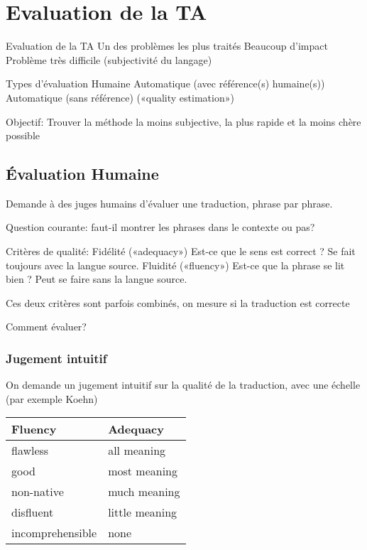 \vspace{-1.2cm}

\section{Evaluation de la TA}

Evaluation de la TA
    Un des problèmes les plus traités
    Beaucoup d’impact
    Problème très difficile (subjectivité du langage)

Types d’évaluation
    Humaine
    Automatique (avec référence(s) humaine(s))
    Automatique (sans référence) («quality estimation»)

    Objectif: Trouver la méthode la moins subjective, la plus rapide et la moins chère possible

\subsection{Évaluation Humaine}

Demande à des juges humains d’évaluer une traduction, phrase par phrase.

Question courante: faut-il montrer les phrases dans le contexte ou pas?

Critères de qualité:
    Fidélité («adequacy»)
        Est-ce que le sens est correct ?
        Se fait toujours avec la langue source.
    Fluidité («fluency»)
        Est-ce que la phrase se lit bien ?
        Peut se faire sans la langue source.

    Ces deux critères sont parfois combinés, on mesure si la traduction est correcte

Comment évaluer?

\subsubsection{Jugement intuitif}

On demande un jugement intuitif sur la qualité de la traduction, avec une échelle (par exemple Koehn)

\begin{table}
    \begin{tabular}{|l|l|}
    \hline
    Fluency          & Adequacy       \\ \hline
    flawless         & all meaning    \\ \hline
    good             & most meaning   \\ \hline
    non-native       & much meaning   \\ \hline
    disfluent        & little meaning \\ \hline
    incomprehensible & none           \\ \hline
    \end{tabular}
\end{table}


